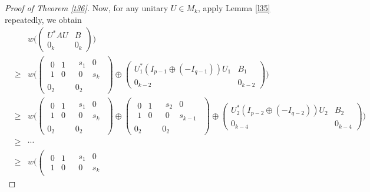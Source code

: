 \documentclass[11pt]{article}
\numberwithin{equation}{section}
\begin{document}
\begin{proof}[Proof of Theorem \ref{t36}]
Now, for any unitary $U\in M_k$, apply Lemma \ref{l35} repeatedly, we obtain
\begin{eqnarray*}
& & w\Big(\begin{pmatrix} U^*AU & B\\ 0_k & 0_k\end{pmatrix}\Big)   \\
& \ge & w\Big(\left(\begin{array}{c|c}\begin{array}{cc} 0 & 1\\ 1 & 0\end{array} & \begin{array}{cc} s_1 & 0\\ 0 & s_k\end{array}
\\ \hline 0_2 & 0_2\end{array}\right)\oplus
\begin{pmatrix} U_1^*(I_{p-1}\oplus (-I_{q-1}))U_1 & B_1\\ 0_{k-2} & 0_{k-2}\end{pmatrix}\Big) \\
& \ge & w\Big(\left(\begin{array}{c|c}\begin{array}{cc} 0 & 1\\ 1 & 0\end{array} & \begin{array}{cc} s_1 & 0\\ 0 & s_k\end{array}
\\ \hline 0_2 & 0_2\end{array}\right)\oplus
\left(\begin{array}{c|c}\begin{array}{cc} 0 & 1\\ 1 & 0\end{array} & \begin{array}{cc} s_2 & 0\\ 0 & s_{k-1}\end{array}
\\ \hline 0_2 & 0_2\end{array}\right) \oplus
\begin{pmatrix} U_2^*(I_{p-2}\oplus (-I_{q-2}))U_2 & B_2\\ 0_{k-4} & 0_{k-4}\end{pmatrix}\Big) \\
& \ge & \cdots \\
& \ge & w\Big(\left(\begin{array}{c|c}\begin{array}{cc} 0 & 1\\ 1 & 0\end{array} & \begin{array}{cc} s_1 & 0\\ 0 & s_k\end{array}

\end{array}
\end{eqnarray*}
\end{proof}
\end{document}
